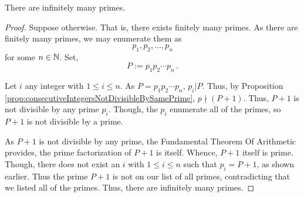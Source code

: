 \guard





\begin{thm}
\label{thm:infinitelyManyPrimes}
  There are infinitely many primes.
\end{thm}
\begin{proof}
  Suppose otherwise.
  That is, there exists finitely many primes.
  As there are finitely many primes, we may enumerate them as \[ p_1,p_2,\dots,p_n\] for some $n\in\mathbb{N}$.
  Set, \[ P := p_1 p_2\cdots p_n\,.\]

  Let $i$ any integer with $1\leq i\leq n$.
  As $P= p_1 p_2\cdots p_n$, $p_i|P$.
  Thus, by Proposition \ref{prop:consecutiveIntegersNotDivisibleBySamePrime}, $p\nmid(P+1)$.
  Thus, $P+1$ is not divisible by any prime $p_i$.
  Though, the $p_i$ enumerate all of the primes, so $P+1$ is not divisible by a prime.

  As $P+1$ is not divisible by any prime, the Fundamental Theorem Of Arithmetic provides, the prime factorization of $P+1$ is itself.
  Whence, $P+1$ itself is prime.
  Though, there does not exist an $i$ with $1\leq i\leq n$ such that $p_i = P+1$, as shown earlier.
  Thus the prime $P+1$ is not on our list of all primes, contradicting that we listed all of the primes.
  Thus, there are infinitely many primes.
\end{proof}
